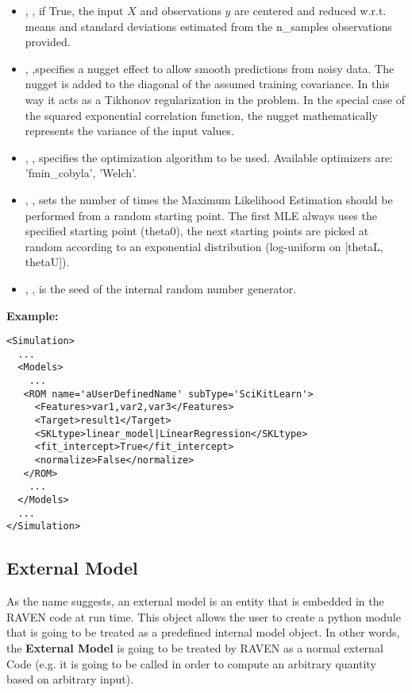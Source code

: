 \begin{itemize}
  \item {}, , if True, the
  input $X$ and observations $y$ are centered and reduced w.r.t. means and
  standard deviations estimated from the n\_samples observations provided.
  \item {}, ,specifies a nugget
  effect to allow smooth predictions from noisy data.
  The nugget is added to the diagonal of the assumed training covariance.
  In this way it acts as a Tikhonov regularization in the problem.
  In the special case of the squared exponential correlation function, the
  nugget mathematically represents the variance of the input values.
  \item {}, , specifies the
  optimization algorithm to be used.
  Available optimizers are: 'fmin\_cobyla', 'Welch'.
  \item {}, , sets the
  number of times the Maximum Likelihood Estimation should be performed from
  a random starting point.
  The first MLE always uses the specified starting point (theta0), the next
  starting points are picked at random according to an exponential distribution
  (log-uniform on [thetaL, thetaU]).
  \item {}, , is the seed
  of the internal random number generator.
\end{itemize}

\textbf{Example:}
\begin{lstlisting}[style=XML,morekeywords={name,subType}]
<Simulation>
  ...
  <Models>
    ...
   <ROM name='aUserDefinedName' subType='SciKitLearn'>
     <Features>var1,var2,var3</Features>
     <Target>result1</Target>
     <SKLtype>linear_model|LinearRegression</SKLtype>
     <fit_intercept>True</fit_intercept>
     <normalize>False</normalize>
   </ROM>
    ...
  </Models>
  ...
</Simulation>
\end{lstlisting}

\subsection{External Model}
\label{subsec:models_externalModel}
As the name suggests, an external model is an entity that is embedded in the
RAVEN code at run time.
%
This object allows the user to create a python module that is going to be
treated as a predefined internal model object.
%
In other words, the \textbf{External Model} is going to be treated by RAVEN as a
normal external Code (e.g. it is going to be called in order to compute an
arbitrary quantity based on arbitrary input).
%

